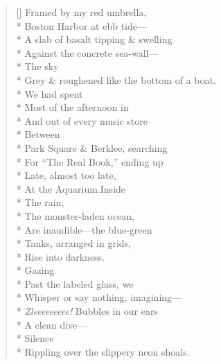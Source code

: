 \label{ch:harbor}
\begin{verse}[\versewidth]
Framed by my red umbrella,\\*
Boston Harbor at ebb tide---\\*
A slab of basalt tipping \& swelling\\*
Against the concrete sea-wall---\\*
\hspace*{4\vgap} The sky\\*
Grey \& roughened like the bottom of a boat.\\*
We had spent\\*
Most of the afternoon in\\*
And out of every music store\\*
\hspace*{4\vgap} Between\\*
Park Square \& Berklee, searching\\*
For ``The Real Book,'' ending up\\*
Late, almost too late,\\*
At the Aquarium.\qquad Inside\\*
\hspace*{4\vgap} The rain,\\*
The monster-laden ocean,\\*
Are inaudible---the blue-green\\*
Tanks, arranged in grids,\\*
Rise into darkness.\\*
\hspace*{4\vgap} Gazing\\*
Past the labeled glass, we\\*
Whisper or say nothing, imagining---\\*
\textit{Zleeeeeeeee!} Bubbles in our ears\\*
A clean dive---\\*
\hspace*{3\vgap} Silence\\*
Rippling over the slippery neon shoals.
\end{verse}
